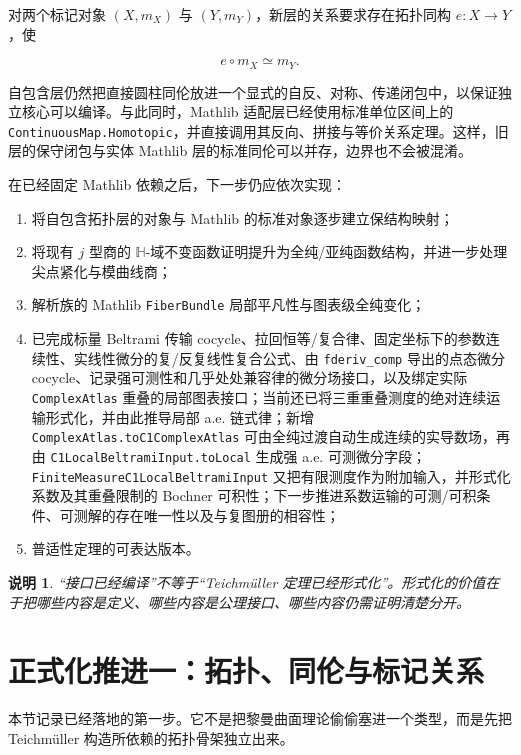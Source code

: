 \documentclass[UTF8,fontset=none,a4paper,11pt]{ctexart}
\newtheorem{remark}[definition]{说明}
\begin{document}
对两个标记对象 $(X,m_X)$ 与 $(Y,m_Y)$，新层的关系要求存在拓扑同构 $e:X\to Y$，使

\[
e\circ m_X\simeq m_Y.
\]

自包含层仍然把直接圆柱同伦放进一个显式的自反、对称、传递闭包中，以保证独立核心可以编译。与此同时，Mathlib 适配层已经使用标准单位区间上的 \texttt{ContinuousMap.Homotopic}，并直接调用其反向、拼接与等价关系定理。这样，旧层的保守闭包与实体 Mathlib 层的标准同伦可以并存，边界也不会被混淆。

在已经固定 Mathlib 依赖之后，下一步仍应依次实现：

\begin{enumerate}[label=(\arabic*)]
  \item 将自包含拓扑层的对象与 Mathlib 的标准对象逐步建立保结构映射；
  \item 将现有 $j$ 型商的 \(\mathbb H\)-域不变函数证明提升为全纯/亚纯函数结构，并进一步处理尖点紧化与模曲线商；
  \item 解析族的 Mathlib \texttt{FiberBundle} 局部平凡性与图表级全纯变化；
  \item 已完成标量 Beltrami 传输 cocycle、拉回恒等/复合律、固定坐标下的参数连续性、实线性微分的复/反复线性复合公式、由 \texttt{fderiv\_comp} 导出的点态微分 cocycle、记录强可测性和几乎处处兼容律的微分场接口，以及绑定实际 \texttt{ComplexAtlas} 重叠的局部图表接口；当前还已将三重重叠测度的绝对连续运输形式化，并由此推导局部 a.e. 链式律；新增 \texttt{ComplexAtlas.toC1ComplexAtlas} 可由全纯过渡自动生成连续的实导数场，再由 \texttt{C1LocalBeltramiInput.toLocal} 生成强 a.e. 可测微分字段；\texttt{FiniteMeasureC1LocalBeltramiInput} 又把有限测度作为附加输入，并形式化系数及其重叠限制的 Bochner 可积性；下一步推进系数运输的可测/可积条件、可测解的存在唯一性以及与复图册的相容性；
  \item 普适性定理的可表达版本。
\end{enumerate}

\begin{remark}
“接口已经编译”不等于“Teichmüller 定理已经形式化”。形式化的价值在于把哪些内容是定义、哪些内容是公理接口、哪些内容仍需证明清楚分开。
\end{remark}

\section{正式化推进一：拓扑、同伦与标记关系}

本节记录已经落地的第一步。它不是把黎曼曲面理论偷偷塞进一个类型，而是先把 Teichmüller 构造所依赖的拓扑骨架独立出来。
\end{document}
